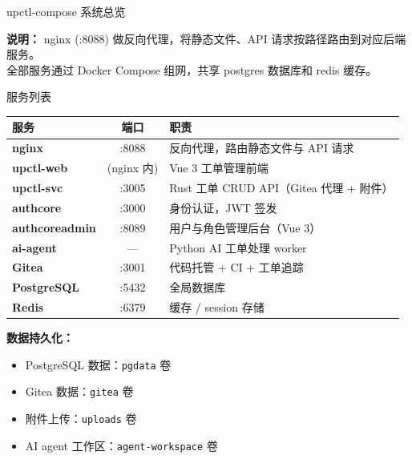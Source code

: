 \documentclass[12pt,aspectratio=169,utf8]{beamer}
\begin{document}
\begin{frame}[shrink=10]{upctl-compose 系统总览}
\begin{center}
\end{center}

\textbf{说明：} nginx (:8088) 做反向代理，将静态文件、API 请求按路径路由到对应后端服务。\\
全部服务通过 Docker Compose 组网，共享 postgres 数据库和 redis 缓存。
\end{frame}

\begin{frame}[shrink=12]{服务列表}
  \begin{table}
    \fontsize{7}{9}\selectfont
    \renewcommand{\arraystretch}{1.1}
    \begin{tabular}{lcl}
      \toprule
      服务 & 端口 & 职责 \\
      \midrule
      \textbf{nginx} & :8088 & 反向代理，路由静态文件与 API 请求 \\
      \textbf{upctl-web} & (nginx 内) & Vue 3 工单管理前端 \\
      \textbf{upctl-svc} & :3005 & Rust 工单 CRUD API（Gitea 代理 + 附件） \\
      \textbf{authcore} & :3000 & 身份认证，JWT 签发 \\
      \textbf{authcoreadmin} & :8089 & 用户与角色管理后台（Vue 3） \\
      \textbf{ai-agent} & --- & Python AI 工单处理 worker \\
      \textbf{Gitea} & :3001 & 代码托管 + CI + 工单追踪 \\
      \textbf{PostgreSQL} & :5432 & 全局数据库 \\
      \textbf{Redis} & :6379 & 缓存 / session 存储 \\
      \bottomrule
    \end{tabular}
  \end{table}

  \vspace{4pt}
  \textbf{数据持久化：}
  \begin{itemize}
    \item PostgreSQL 数据：\texttt{pgdata} 卷
    \item Gitea 数据：\texttt{gitea} 卷
    \item 附件上传：\texttt{uploads} 卷
    \item AI agent 工作区：\texttt{agent-workspace} 卷
  \end{itemize}
\end{frame}
\end{document}
